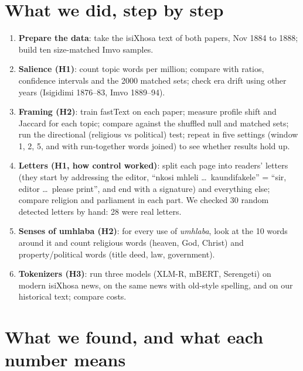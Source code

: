 \documentclass[11pt]{article}
\newcommand{\key}[1]{\textbf{#1}}
\begin{document}
\section{What we did, step by step}
\begin{enumerate}
\item \key{Prepare the data}: take the isiXhosa text of both papers, Nov 1884 to 1888; build ten size-matched Imvo samples.
\item \key{Salience (H1)}: count topic words per million; compare with ratios, confidence intervals and the 2000 matched sets; check era drift using other years (Isigidimi 1876--83, Imvo 1889--94).
\item \key{Framing (H2)}: train fastText on each paper; measure profile shift and Jaccard for each topic; compare against the shuffled null and matched sets; run the directional (religious vs political) test; repeat in five settings (window 1, 2, 5, and with run-together words joined) to see whether results hold up.
\item \key{Letters (H1, how control worked)}: split each page into readers' letters (they start by addressing the editor, ``nkosi mhleli \dots\ kaundifakele'' = ``sir, editor \dots\ please print'', and end with a signature) and everything else; compare religion and parliament in each part. We checked 30 random detected letters by hand: 28 were real letters.
\item \key{Senses of umhlaba (H2)}: for every use of \emph{umhlaba}, look at the 10 words around it and count religious words (heaven, God, Christ) and property/political words (title deed, law, government).
\item \key{Tokenizers (H3)}: run three models (XLM-R, mBERT, Serengeti) on modern isiXhosa news, on the same news with old-style spelling, and on our historical text; compare costs.
\end{enumerate}

\section{What we found, and what each number means}
\end{document}
